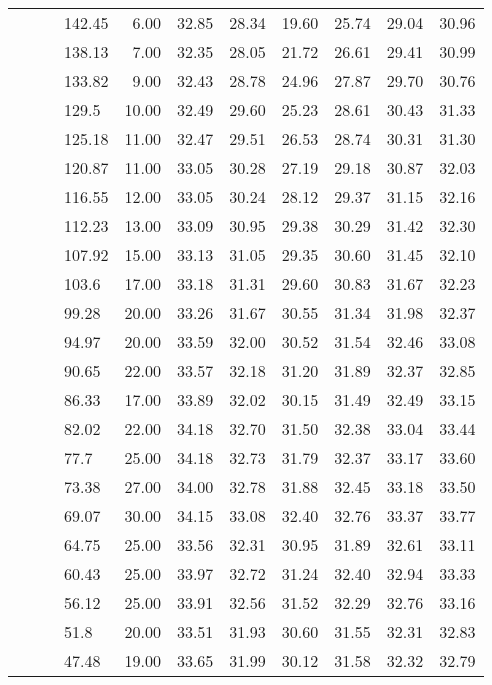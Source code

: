 \begin{longtable}{llllrrrrrrr}
   &  &  & 142.45 & 6.00 & 32.85 & 28.34 & 19.60 & 25.74 & 29.04 & 30.96 \\ 
   &  &  & 138.13 & 7.00 & 32.35 & 28.05 & 21.72 & 26.61 & 29.41 & 30.99 \\ 
   &  &  & 133.82 & 9.00 & 32.43 & 28.78 & 24.96 & 27.87 & 29.70 & 30.76 \\ 
   &  &  & 129.5 & 10.00 & 32.49 & 29.60 & 25.23 & 28.61 & 30.43 & 31.33 \\ 
   &  &  & 125.18 & 11.00 & 32.47 & 29.51 & 26.53 & 28.74 & 30.31 & 31.30 \\ 
   &  &  & 120.87 & 11.00 & 33.05 & 30.28 & 27.19 & 29.18 & 30.87 & 32.03 \\ 
   &  &  & 116.55 & 12.00 & 33.05 & 30.24 & 28.12 & 29.37 & 31.15 & 32.16 \\ 
   &  &  & 112.23 & 13.00 & 33.09 & 30.95 & 29.38 & 30.29 & 31.42 & 32.30 \\ 
   &  &  & 107.92 & 15.00 & 33.13 & 31.05 & 29.35 & 30.60 & 31.45 & 32.10 \\ 
   &  &  & 103.6 & 17.00 & 33.18 & 31.31 & 29.60 & 30.83 & 31.67 & 32.23 \\ 
   &  &  & 99.28 & 20.00 & 33.26 & 31.67 & 30.55 & 31.34 & 31.98 & 32.37 \\ 
   &  &  & 94.97 & 20.00 & 33.59 & 32.00 & 30.52 & 31.54 & 32.46 & 33.08 \\ 
   &  &  & 90.65 & 22.00 & 33.57 & 32.18 & 31.20 & 31.89 & 32.37 & 32.85 \\ 
   &  &  & 86.33 & 17.00 & 33.89 & 32.02 & 30.15 & 31.49 & 32.49 & 33.15 \\ 
   &  &  & 82.02 & 22.00 & 34.18 & 32.70 & 31.50 & 32.38 & 33.04 & 33.44 \\ 
   &  &  & 77.7 & 25.00 & 34.18 & 32.73 & 31.79 & 32.37 & 33.17 & 33.60 \\ 
   &  &  & 73.38 & 27.00 & 34.00 & 32.78 & 31.88 & 32.45 & 33.18 & 33.50 \\ 
   &  &  & 69.07 & 30.00 & 34.15 & 33.08 & 32.40 & 32.76 & 33.37 & 33.77 \\ 
   &  &  & 64.75 & 25.00 & 33.56 & 32.31 & 30.95 & 31.89 & 32.61 & 33.11 \\ 
   &  &  & 60.43 & 25.00 & 33.97 & 32.72 & 31.24 & 32.40 & 32.94 & 33.33 \\ 
   &  &  & 56.12 & 25.00 & 33.91 & 32.56 & 31.52 & 32.29 & 32.76 & 33.16 \\ 
   &  &  & 51.8 & 20.00 & 33.51 & 31.93 & 30.60 & 31.55 & 32.31 & 32.83 \\ 
   &  &  & 47.48 & 19.00 & 33.65 & 31.99 & 30.12 & 31.58 & 32.32 & 32.79 \\ 

\end{longtable}
